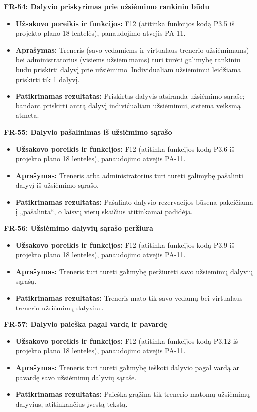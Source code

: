 \vspace{0.3cm}
\noindent\textbf{FR-54: Dalyvio priskyrimas prie užsiėmimo rankiniu būdu}
\begin{itemize}
    \item \textbf{Užsakovo poreikis ir funkcijos:} F12 (atitinka funkcijos kodą P3.5 iš projekto plano 18 lentelės), panaudojimo atvejis PA-11.
    \item \textbf{Aprašymas:} Treneris (savo vedamiems ir virtualaus trenerio užsiėmimams) bei administratorius (visiems užsiėmimams) turi turėti galimybę rankiniu būdu priskirti dalyvį prie užsiėmimo. Individualiam užsiėmimui leidžiama priskirti tik 1 dalyvį.
    \item \textbf{Patikrinamas rezultatas:} Priskirtas dalyvis atsiranda užsiėmimo sąraše; bandant priskirti antrą dalyvį individualiam užsiėmimui, sistema veiksmą atmeta.
\end{itemize}

\vspace{0.3cm}
\noindent\textbf{FR-55: Dalyvio pašalinimas iš užsiėmimo sąrašo}
\begin{itemize}
    \item \textbf{Užsakovo poreikis ir funkcijos:} F12 (atitinka funkcijos kodą P3.6 iš projekto plano 18 lentelės), panaudojimo atvejis PA-11.
    \item \textbf{Aprašymas:} Treneris arba administratorius turi turėti galimybę pašalinti dalyvį iš užsiėmimo sąrašo.
    \item \textbf{Patikrinamas rezultatas:} Pašalinto dalyvio rezervacijos būsena pakeičiama į „pašalinta“, o laisvų vietų skaičius atitinkamai padidėja.
\end{itemize}

\vspace{0.3cm}
\noindent\textbf{FR-56: Užsiėmimo dalyvių sąrašo peržiūra}
\begin{itemize}
    \item \textbf{Užsakovo poreikis ir funkcijos:} F12 (atitinka funkcijos kodą P3.9 iš projekto plano 18 lentelės), panaudojimo atvejis PA-11.
    \item \textbf{Aprašymas:} Treneris turi turėti galimybę peržiūrėti savo užsiėmimų dalyvių sąrašą.
    \item \textbf{Patikrinamas rezultatas:} Treneris mato tik savo vedamų bei virtualaus trenerio užsiėmimų dalyvius.
\end{itemize}

\vspace{0.3cm}
\noindent\textbf{FR-57: Dalyvio paieška pagal vardą ir pavardę}
\begin{itemize}
    \item \textbf{Užsakovo poreikis ir funkcijos:} F12 (atitinka funkcijos kodą P3.12 iš projekto plano 18 lentelės), panaudojimo atvejis PA-11.
    \item \textbf{Aprašymas:} Treneris turi turėti galimybę ieškoti dalyvio pagal vardą ar pavardę savo užsiėmimų dalyvių sąraše.
    \item \textbf{Patikrinamas rezultatas:} Paieška grąžina tik trenerio matomų užsiėmimų dalyvius, atitinkančius įvestą tekstą.
\end{itemize}

